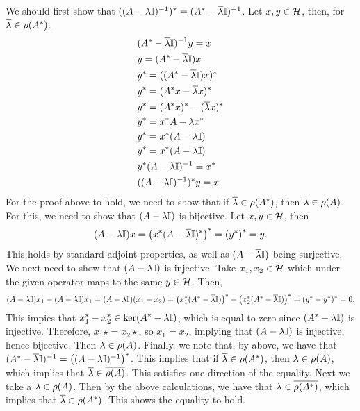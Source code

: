 \begin{solution}

    We should first show that $((A - \mathrm{\lambda} \mathbb{I})^{-1})^{*} = (A^{*} - \overline{\mathrm{\lambda}}\mathbb{I})^{-1}$. Let $x, y \in \mathcal{H}$, then, for $\overline{\mathrm{\lambda}} \in \rho(A^{*})$. 
    \alignbreak
    \begin{align*}
        &(A^{*} - \overline{\mathrm{\lambda}}\mathbb{I})^{-1} y = x\\
        &y = (A^{*} - \overline{\mathrm{\lambda}}\mathbb{I})x\\
        &y^{*} = ((A^{*} - \overline{\mathrm{\lambda}}\mathbb{I})x)^{*}\\
        &y^{*} = (A^{*} x - \overline{\mathrm{\lambda}}x)^{*}\\
        &y^{*} = (A^{*} x)^{*} - (\overline{\mathrm{\lambda}}x)^{*}\\
        &y^{*} = x^{*} A - \mathrm{\lambda} x^{*}\\
        &y^{*} = x^{*} (A - \mathrm{\lambda} \mathbb{I})\\
        &y^{*} = x^{*} (A - \mathrm{\lambda} \mathbb{I})\\
        &y^{*} (A - \mathrm{\lambda} \mathbb{I})^{-1} = x^{*}\\
        &((A - \mathrm{\lambda} \mathbb{I})^{-1})^{*} y = x
    \end{align*}
    \alignbreak
    For the proof above to hold, we need to show that if $\overline{\mathrm{\lambda}} \in \rho(A^{*})$, then $\mathrm{\lambda}\in\rho(A)$. For this, we need to show that $(A - \mathrm{\lambda}\mathbb{I})$ is bijective. Let $x, y \in \mathcal{H}$, then
    \[(A - \mathrm{\lambda}\mathbb{I})x = \left(x^{*}(A - \overline{\mathrm{\lambda}}\mathbb{I})^{*}\right)^{*} = \left(y^{*}\right)^{*} = y.\]
    This holds by standard adjoint properties, as well as $(A - \overline{\mathrm{\lambda}}\mathbb{I})$ being surjective. We next need to show that $(A - \mathrm{\lambda} \mathbb{I})$ is injective. Take $x_1, x_2 \in \mathcal{H}$ which under the given operator maps to the same $y \in \mathcal{H}$. Then,
    \[(A - \mathrm{\lambda}\mathbb{I})x_1 - (A - \mathrm{\lambda}\mathbb{I})x_1 = (A - \mathrm{\lambda}\mathbb{I})(x_1 - x_2) = \left(x_1^{*} (A^{*} - \overline{\mathrm{\lambda}}\mathbb{I})\right)^{*} - \left(x_2^{*} (A^{*} - \overline{\mathrm{\lambda}}\mathbb{I})\right)^{*} = (y^{*} - y^{*})^{*} = 0.\]
    This impies that $x_1^{*} - x_2^{*} \in \ker(A^{*} - \mathrm{\lambda}\mathbb{I})$, which is equal to zero since $(A^{*} - \mathrm{\lambda}\mathbb{I})$ is injective. Therefore, $x_1\star = x_2\star$, so $x_1 = x_2$, implying that $(A - \mathrm{\lambda}\mathbb{I})$ is injective, hence bijective. Then $\mathrm{\lambda} \in \rho(A)$.
    \newpage
    Finally, we note that, by above, we have that $(A^{*} - \overline{\mathrm{\lambda}}\mathbb{I})^{-1} = \left((A - \mathrm{\lambda}\mathbb{I})^{-1}\right)^{*}$. This implies that if $\overline{\mathrm{\lambda}} \in \rho(A^{*})$, then $\mathrm{\lambda} \in \rho(A)$, which implies that $\overline{\mathrm{\lambda}} \in \overline{\rho(A)}$. This satisfies one direction of the equality. Next we take a $\mathrm{\lambda} \in \rho(A)$. Then by the above calculations, we have that $\mathrm{\lambda} \in \overline{\rho(A^{*})}$, which implies that $\overline{\mathrm{\lambda}} \in \rho(A^{*})$. This shows the equality to hold. 
\end{solution}

